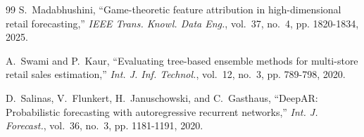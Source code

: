 \documentclass[11pt,a4paper]{article}
\begin{document}
\begin{thebibliography}{99}
S.~Madabhushini, ``Game-theoretic feature attribution in high-dimensional retail forecasting,'' \emph{IEEE Trans. Knowl. Data Eng.}, vol.~37, no.~4, pp. 1820-1834, 2025.

A.~Swami and P.~Kaur, ``Evaluating tree-based ensemble methods for multi-store retail sales estimation,'' \emph{Int. J. Inf. Technol.}, vol.~12, no.~3, pp. 789-798, 2020.

D.~Salinas, V.~Flunkert, H.~Januschowski, and C.~Gasthaus, ``DeepAR: Probabilistic forecasting with autoregressive recurrent networks,'' \emph{Int. J. Forecast.}, vol.~36, no.~3, pp. 1181-1191, 2020.

\end{thebibliography}
\end{document}
